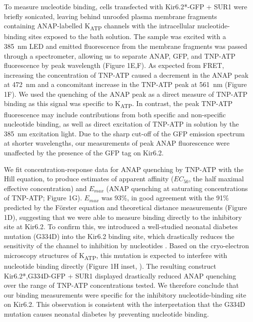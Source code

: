 \documentclass[10pt,lineno, doublespacing]{elife}
\begin{document}
To measure nucleotide binding, cells transfected with Kir6.2*-GFP + SUR1 were briefly sonicated, leaving behind unroofed plasma membrane fragments \citep{RN21, RN22, RN80} containing ANAP-labelled K\textsubscript{ATP} channels with the intracellular nucleotide-binding sites exposed to the bath solution.
The sample was excited with a \SI{385}{\nano\metre} LED and emitted fluorescence from the membrane fragments was passed through a spectrometer, allowing us to separate ANAP, GFP, and TNP-ATP fluorescence by peak wavelength (Figure 1E,F).
As expected from FRET, increasing the concentration of TNP-ATP caused a decrement in the ANAP peak at \SI{472}{\nano\metre} and a concomitant increase in the TNP-ATP peak at \SI{561}{\nano\metre} (Figure 1F).
We used the quenching of the ANAP peak as a direct measure of TNP-ATP binding as this signal was specific to K\textsubscript{ATP}.
In contrast, the peak TNP-ATP fluorescence may include contributions from both specific and non-specific nucleotide binding, as well as direct excitation of TNP-ATP in solution by the \SI{385}{\nano\metre} excitation light.
Due to the sharp cut-off of the GFP emission spectrum at shorter wavelengths, our measurements of peak ANAP fluorescence were unaffected by the presence of the GFP tag on Kir6.2.

We fit concentration-response data for ANAP quenching by TNP-ATP with the Hill equation, to produce estimates of apparent affinity ($EC_{50}$, the half maximal effective concentration) and $E_{max}$ (ANAP quenching at saturating concentrations of TNP-ATP; Figure 1G).
$E_{max}$ was 93\%, in good agreement with the 91\% predicted by the Förster equation and theoretical distance measurements (Figure 1D), suggesting that we were able to measure binding directly to the inhibitory site at Kir6.2.
To confirm this, we introduced a well-studied neonatal diabetes mutation (G334D) into the Kir6.2 binding site, which drastically reduces the sensitivity of the channel to inhibition by nucleotides \citep{RN27, RN88, RN28}.
Based on the cryo-electron microscopy structures of K\textsubscript{ATP}, this mutation is expected to interfere with nucleotide binding directly (Figure 1H inset, \cite{RN6}).
The resulting construct Kir6.2*,G334D-GFP + SUR1 displayed drastically reduced ANAP quenching over the range of TNP-ATP concentrations tested.
We therefore conclude that our binding measurements were specific for the inhibitory nucleotide-binding site on Kir6.2.
This observation is consistent with the interpretation that the G334D mutation causes neonatal diabetes by preventing nucleotide binding.
\end{document}
